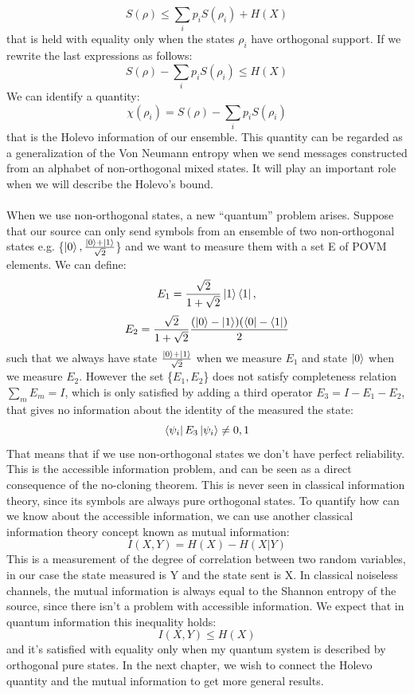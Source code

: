 \documentclass[journal, letterpaper]{IEEEtran}
\begin{document}
\[S(\rho) \le \sum_{i}p_iS(\rho_i) + H(X)\] that is held with equality only when the states $\rho_i$ have orthogonal support. If we rewrite the last expressions as follows: 
\[S(\rho) - \sum_{i}p_iS(\rho_i) \le  H(X)\]
We can identify a quantity: \[\chi(\rho_i) = S(\rho) - \sum_{i}p_iS(\rho_i)\] that is the Holevo information of our ensemble. This quantity can be regarded as a generalization of the Von Neumann entropy when we send messages constructed from an alphabet of non-orthogonal mixed states. It will play an important role when we will describe the Holevo's bound.
\\
\\
When we use non-orthogonal states, a new “quantum” problem arises. Suppose that our source can only send symbols from an ensemble of two non-orthogonal states e.g. \{$\ket{0}, \frac{\ket{0}+\ket{1}}{\sqrt{2}}$\} and we want to measure them with a set {E} of POVM elements. We can define: \[E_1 = \frac{\sqrt{2}}{1+\sqrt{2}}\ket{1}\bra{1},\] \[E_2 = \frac{\sqrt{2}}{1+\sqrt{2}}\frac{(\ket{0}-\ket{1})(\bra{0}-\bra{1})}{2}\] such that we always have state $\frac{\ket{0}+\ket{1}}{\sqrt{2}}$ when we measure $E_1$ and state $\ket{0}$ when we measure $E_2$. However the set \{$E_1,E_2$\} does not satisfy completeness relation $\sum_mE_m = I$, which is only satisfied by adding a third operator $E_3 = I- E_1-E_2$, that gives no information about the identity of the measured the state: \[\bra{\psi_i}E_3\ket{\psi_i} \neq 0,1 \] That means that if we use non-orthogonal states we don't have perfect reliability. This is the accessible information problem, and can be seen as a direct consequence of the no-cloning theorem. This is never seen in classical information theory, since its symbols are always pure orthogonal states. To quantify how can we know about the accessible information, we can use another classical information theory concept known as mutual information: 
\[I(X,Y) = H(X) - H(X|Y)\]
This is a measurement of the degree of correlation between two random variables, in our case the state measured is Y and the state sent is X. In classical noiseless channels, the mutual information is always equal to the Shannon entropy of the source, since there isn't a problem with accessible information. We expect that in quantum information this inequality holds: \[I(X,Y) \le H(X)\]and it's satisfied with equality only when my quantum system is described by orthogonal pure states. In the next chapter, we wish to connect the Holevo quantity and the mutual information to get more general results. 
\end{document}
